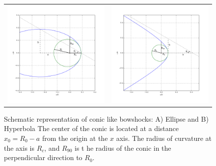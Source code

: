 \begin{figure}
\setlength\tabcolsep{0pt}
\begin{tabular}{cc}
\includegraphics[height=0.54\linewidth, trim=30 0 30 0, clip]{ellipse_py_lab} &
\includegraphics[height=0.54\linewidth, trim=60 0 70 0, clip]{hyperbola_py_lab}
\end{tabular}
\label{fig:conics}
\caption{Schematic representation of conic like bowshocks: A) Ellipse and B) Hyperbola The center of the conic is located at a distance $x_0=R_0-a$ from the origin at the $x$ axis. 
The radius of curvature at the axis is $R_c$, and $R_{90}$ is t he radius of the conic in the perpendicular direction to $R_0$.
}
\end{figure}
